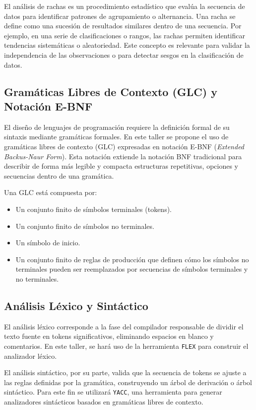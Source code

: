 \documentclass{article}
\begin{document}
El análisis de rachas es un procedimiento estadístico que evalúa la secuencia de datos para identificar patrones de agrupamiento o alternancia. Una racha se define como una sucesión de resultados similares dentro de una secuencia. Por ejemplo, en una serie de clasificaciones o rangos, las rachas permiten identificar tendencias sistemáticas o aleatoriedad. Este concepto es relevante para validar la independencia de las observaciones o para detectar sesgos en la clasificación de datos.

\subsection*{Gramáticas Libres de Contexto (GLC) y Notación E-BNF}

El diseño de lenguajes de programación requiere la definición formal de su sintaxis mediante gramáticas formales. En este taller se propone el uso de gramáticas libres de contexto (GLC) expresadas en notación E-BNF (\textit{Extended Backus-Naur Form}). Esta notación extiende la notación BNF tradicional para describir de forma más legible y compacta estructuras repetitivas, opciones y secuencias dentro de una gramática.

Una GLC está compuesta por:
\begin{itemize}
    \item Un conjunto finito de símbolos terminales (tokens).
    \item Un conjunto finito de símbolos no terminales.
    \item Un símbolo de inicio.
    \item Un conjunto finito de reglas de producción que definen cómo los símbolos no terminales pueden ser reemplazados por secuencias de símbolos terminales y no terminales.
\end{itemize}

\subsection*{Análisis Léxico y Sintáctico}

El análisis léxico corresponde a la fase del compilador responsable de dividir el texto fuente en tokens significativos, eliminando espacios en blanco y comentarios. En este taller, se hará uso de la herramienta \texttt{FLEX} para construir el analizador léxico. 

El análisis sintáctico, por su parte, valida que la secuencia de tokens se ajuste a las reglas definidas por la gramática, construyendo un árbol de derivación o árbol sintáctico. Para este fin se utilizará \texttt{YACC}, una herramienta para generar analizadores sintácticos basados en gramáticas libres de contexto.
\end{document}
